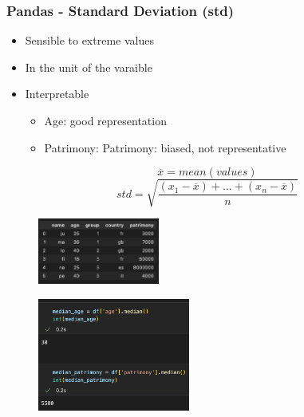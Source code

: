 \begin{frame}\frametitle{Pandas - Standard Deviation (std)}
   \begin{minipage}{0.58\linewidth}
      \begin{itemize}
         \item Sensible to extreme values
         \item In the unit of the varaible
         \item Interpretable
         \begin{itemize}
            \item Age: good representation
            \item Patrimony: Patrimony: biased, not representative
         \end{itemize}
      \end{itemize}
      \vspace{.5cm}
      $$\overline{x} = mean(values)$$
      $$std = \sqrt{\frac{(x_1-\overline{x}) + ... + (x_n-\overline{x})}{n}}$$
      \begin{figure}[H]
         \includegraphics[width=4cm]{../images/illustrations/data_analysis_df_1.png}
      \end{figure}
   \end{minipage}
   \begin{minipage}{0.38\linewidth}
      \begin{figure}[H]
         \includegraphics[width=5cm]{../images/illustrations/median.png}
      \end{figure}
   \end{minipage}
\end{frame}


